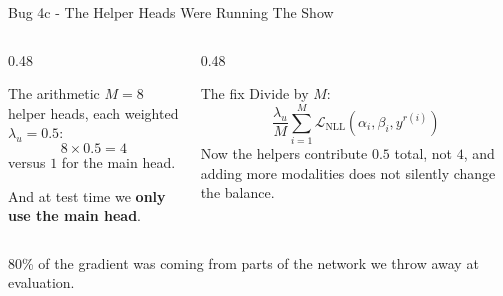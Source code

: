 \documentclass[aspectratio=169]{beamer}
\begin{document}
	\begin{frame}{Bug 4c - The Helper Heads Were Running The Show}
		\begin{columns}[onlytextwidth]
			\begin{column}{0.48\textwidth}
				\begin{alertblock}{The arithmetic}
					\small
					$M = 8$ helper heads, each weighted $\lambda_u = 0.5$:
					$$ 8 \times 0.5 = 4 $$
					versus $1$ for the main head.
					\vspace{0.3em}

					And at test time we \textbf{only use the main head}.
				\end{alertblock}
			\end{column}
			\begin{column}{0.48\textwidth}
				\begin{block}{The fix}
					\small
					Divide by $M$:
					$$ \frac{\lambda_u}{M}\sum_{i=1}^{M}\mathcal{L}_{\text{NLL}}(\alpha_i,\beta_i,y^{r(i)}) $$
					Now the helpers contribute $0.5$ total, not $4$, and adding more modalities
					does not silently change the balance.
				\end{block}
			\end{column}
		\end{columns}
		\vspace{0.5em}
		\centering\small
		80\% of the gradient was coming from parts of the network we throw away at evaluation.
	\end{frame}
\end{document}
